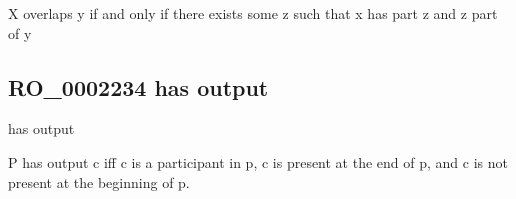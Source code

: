 \documentclass[letterpaper,10pt,english]{sphinxmanual}
\begin{document}
\begin{sphinxShadowBox}

\sphinxAtStartPar
X overlaps y if and only if there exists some z such that x has part z and z part of y
\end{sphinxShadowBox}

\begin{sphinxShadowBox}

\sphinxAtStartPar
{}
\end{sphinxShadowBox}
\begin{quote}

\ignorespaces \end{quote}


\subsection{RO\_0002234 \sphinxhyphen{} has output}
\label{\detokenize{doc-RO_0002234:ro-0002234-has-output}}\label{\detokenize{doc-RO_0002234:index-0}}\label{\detokenize{doc-RO_0002234::doc}}
\begin{sphinxShadowBox}

\sphinxAtStartPar
has output
\end{sphinxShadowBox}

\begin{sphinxShadowBox}

\sphinxAtStartPar
{}
\end{sphinxShadowBox}

\begin{sphinxShadowBox}

\sphinxAtStartPar
P has output c iff c is a participant in p, c is present at the end of p, and c is not present at the beginning of p.
\end{sphinxShadowBox}

\begin{sphinxShadowBox}

\sphinxAtStartPar
{}
\end{sphinxShadowBox}
\end{document}

